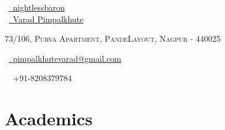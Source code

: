 \documentclass[a4paper,10pt]{extarticle} %
\begin{document}
\pagestyle{empty} %


\begin{multicols}{3}
\normalsize \faGithub\ {\href{https://github.com/nightlessbaron}{\  nightlessbaron}}\\
\normalsize  \faLinkedinSquare\ {\href{https://www.linkedin.com/in/varad-pimpalkhute-a526a9167/}{\  Varad Pimpalkhute}}\\
\columnbreak
\normalsize\par{\centering{\huge\textsc{\textcolor{primary}{Varad Pimpalkhute}}}\par} %
\par{\centering\normalsize {\textsc{73/106, Purva Apartment, PandeLayout, Nagpur - 440025}}\hfill\par}
\columnbreak
\raggedright\hfill\normalsize \faEnvelope\ {\href{mailto:pimpalkhutevarad@gmail.com}{\  pimpalkhutevarad@gmail.com}}\\
\raggedright\hfill{\faPhone\ \  +91-8208379784}
\end{multicols}


\vspace{-0.95cm}
\section{\textcolor{primary}{Academics}}
\end{document}
